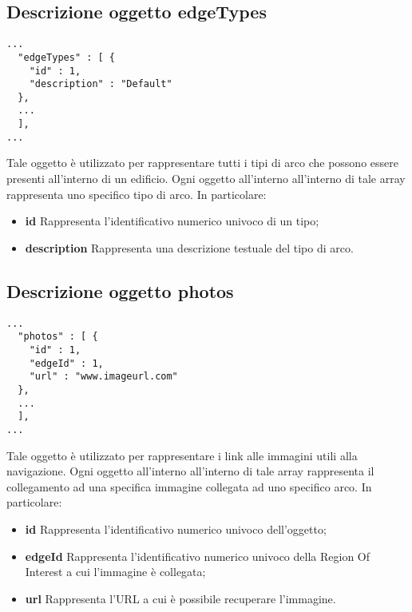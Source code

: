 \documentclass[../ManualeSviluppatore.tex]{subfiles}
\begin{document}
	\subsection{Descrizione oggetto edgeTypes}
		\begin{lstlisting}
...
  "edgeTypes" : [ {
    "id" : 1,
    "description" : "Default"
  }, 
  ...
  ],
...
		\end{lstlisting}
		Tale oggetto è utilizzato per rappresentare tutti i tipi di arco che possono essere presenti all'interno di un edificio. Ogni oggetto all'interno all'interno di tale array rappresenta uno specifico tipo di arco. In particolare:
		\begin{itemize}
			\item \textbf{id} Rappresenta l'identificativo numerico univoco di un tipo;
			\item \textbf{description} Rappresenta una descrizione testuale del tipo di arco.
		\end{itemize}
	\subsection{Descrizione oggetto photos}
		\begin{lstlisting}
...
  "photos" : [ {
    "id" : 1,
    "edgeId" : 1,
    "url" : "www.imageurl.com"
  },  
  ...
  ],
...
		\end{lstlisting}
		Tale oggetto è utilizzato per rappresentare i link alle immagini utili alla navigazione. Ogni oggetto all'interno all'interno di tale array rappresenta il collegamento ad una specifica immagine collegata ad uno specifico arco. In particolare:
		\begin{itemize}
			\item \textbf{id} Rappresenta l'identificativo numerico univoco dell'oggetto;
			\item \textbf{edgeId} Rappresenta l'identificativo numerico univoco della Region Of Interest a cui l'immagine è collegata;
			\item \textbf{url} Rappresenta l'URL a cui è possibile recuperare l'immagine.
		\end{itemize}
\end{document}
